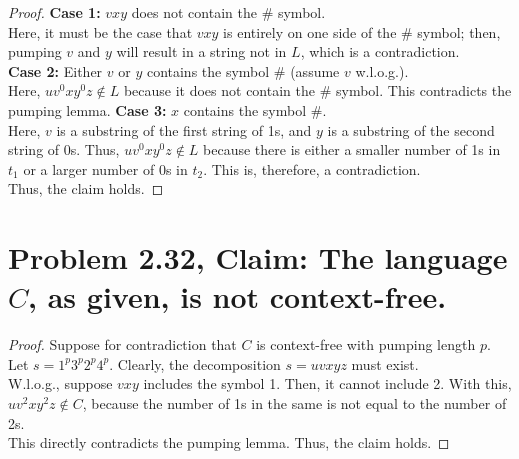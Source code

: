 \documentclass[12pt]{article}
\begin{document}
\begin{enumerate}
\begin{proof}
    \newline
    \textbf{Case 1:} $vxy$ does not contain the $\# $ symbol. \\
    \newline
    Here, it must be the case that $vxy$ is entirely on one side of the $\#$ symbol; then, pumping $v$ and $y$ will result in a string not in $L$, which is a contradiction. \\
    \newline
    \textbf{Case 2:} Either $v$ or $y$ contains the symbol $\#$ (assume $v$ w.l.o.g.). \\
    \newline
    Here, $uv^{0}xy^{0}z \notin L$ because it does not contain the $\#$ symbol. This contradicts the pumping lemma.
    \textbf{Case 3:} $x$ contains the symbol $\#$. \\
    \newline
    Here, $v$ is a substring of the first string of 1s, and $y$ is a substring of the second string of 0s. Thus, $uv^{0}xy^{0}z \notin L$ because there is either a smaller number of 1s in $t_{1}$ or a larger number of 0s in $t_{2}$. This is, therefore, a contradiction. \\
    \newline
    Thus, the claim holds.
  \end{proof}
\end{enumerate}

\section*{Problem 2.32, Claim: The language $C$, as given, is not context-free.}
\begin{proof}
  Suppose for contradiction that $C$ is context-free with pumping length $p$. Let $s = 1^{p}3^{p}2^{p}4^{p}$. Clearly, the decomposition $s = uvxyz$ must exist.\\
  \newline
  W.l.o.g., suppose $vxy$ includes the symbol 1. Then, it cannot include 2. With this, $uv^{2}xy^{2}z \notin C$, because the number of 1s in the same is not equal to the number of 2s. \\
  \newline
  This directly contradicts the pumping lemma. Thus, the claim holds.
\end{proof}
\end{document}
